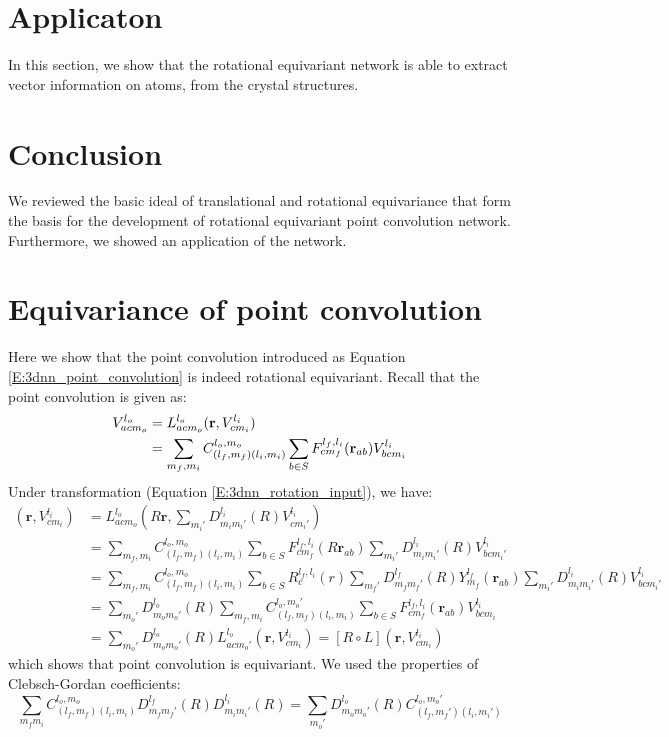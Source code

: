 \documentclass{IEEEtran}
\begin{document}
\section{Applicaton}
In this section, we show that the rotational equivariant network is able to extract vector information 
on atoms, from the crystal structures.

\section{Conclusion}
We reviewed the basic ideal of translational and rotational equivariance that form the basis
for the development of rotational equivariant point convolution network. Furthermore, we showed
an application of the network. 

\printbibliography[title={Reference}]

\onecolumn

\appendices

\section{Equivariance of point convolution}
\label{A:proof_equivariance_point}
Here we show that the point convolution introduced as Equation \eqref{E:3dnn_point_convolution} is indeed 
rotational equivariant. Recall that the point convolution is given as:
\begin{align*}
    V_{acm_o}^{l_o} &= L^{l_o}_{acm_o} (\mathbf{r}, V_{cm_i}^{l_i}) \notag\\
    &= \sum_{m_f, m_i} C^{l_o,m_o}_{(l_f, m_f)(l_i,m_i)} \sum_{b \in S} F_{cm_f}^{l_f, l_i}(\mathbf{r}_{ab}) V^{l_i}_{bcm_i}
\end{align*}
Under transformation (Equation \eqref{E:3dnn_rotation_input}), we have:
\begin{align*}
    [ L \circ R ] (\mathbf{r}, V_{cm_i}^{l_i}) &= 
    L^{l_o}_{acm_o} (R \mathbf{r}, \sum_{m_i'}D_{m_im_i'}^{l_i}(R)V_{cm_i'}^{l_i}) \\
    &= \sum_{m_f, m_i} C^{l_o,m_o}_{(l_f, m_f)(l_i,m_i)} \sum_{b \in S} F_{cm_f}^{l_f, l_i}(R\mathbf{r}_{ab}) \sum_{m_i'}D_{m_im_i'}^{l_i}(R)V_{bcm_i'}^{l_i} \\
    &= \sum_{m_f, m_i} C^{l_o,m_o}_{(l_f, m_f)(l_i,m_i)} 
            \sum_{b \in S} R_c^{l_f, l_i} (r) \sum_{m_f'} D_{m_fm_f'}^{l_f}(R)  Y_{m_f}^{l_f}(\mathbf{r}_{ab}) \sum_{m_i'}D_{m_im_i'}^{l_i}(R)V_{bcm_i'}^{l_i} \\
    &= \sum_{m_o'} D_{m_om_o'}^{l_o}(R) \sum_{m_f, m_i} C^{l_o,m_o'}_{(l_f, m_f)(l_i,m_i)}  \sum_{b \in S} F_{cm_f}^{l_f, l_i}(\mathbf{r}_{ab}) V_{bcm_i}^{l_i} \\
    &= \sum_{m_o'} D_{m_om_o'}^{l_o}(R) L^{l_o}_{acm_o'} (\mathbf{r}, V_{cm_i}^{l_i}) = [ R \circ L ] (\mathbf{r}, V_{cm_i}^{l_i})
\end{align*}
which shows that point convolution is equivariant. We used the properties of Clebsch-Gordan coefficients:
\begin{equation}
    \sum_{m_fm_i} C^{l_o,m_o}_{(l_f, m_f)(l_i,m_i)} D_{m_fm_f'}^{l_f}(R) D_{m_im_i'}^{l_i}(R) = \sum_{m_o'} D_{m_om_o'}^{l_o}(R) C^{l_o,m_o'}_{(l_f, m_f')(l_i,m_i')}
\end{equation}
\end{document}
